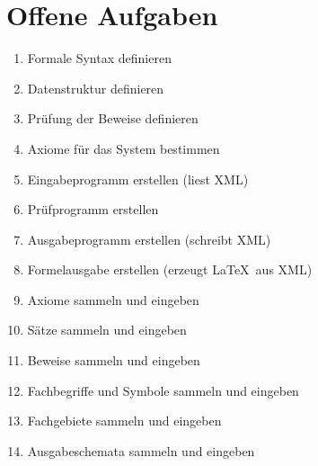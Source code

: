 \documentclass[english,ngerman,parskip=half,headsepline,footsepline]{scrreprt}
\begin{document}
	\section{Offene Aufgaben}
	\label{Offene Aufgaben}
	
	\begin{enumerate}
		\item Formale Syntax definieren
		\item Datenstruktur definieren
		\item Prüfung der Beweise definieren
		\item Axiome für das System bestimmen
		\item Eingabeprogramm erstellen (liest XML)
		\item Prüfprogramm erstellen
		\item Ausgabeprogramm erstellen (schreibt XML)
		\item Formelausgabe erstellen (erzeugt \LaTeX\ aus XML)
		\item Axiome sammeln und eingeben
		\item Sätze sammeln und eingeben
		\item Beweise sammeln und eingeben
		\item Fachbegriffe und Symbole sammeln und eingeben
		\item Fachgebiete sammeln und eingeben
		\item Ausgabeschemata sammeln und eingeben
	\end{enumerate}
		

    \clearpage
    
	\begin{minipage}{\textwidth}
    	\listoftables
    \end{minipage}
	\thispagestyle{scrheadings}
	
    \begin{minipage}{\textwidth}
    	\listoffigures
    \end{minipage}
	\thispagestyle{scrheadings}
	
\end{document}
